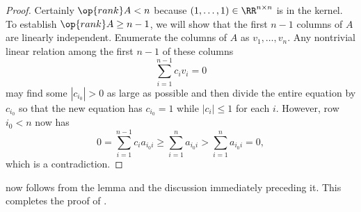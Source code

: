 \documentclass[../notes.tex]{subfiles}
\begin{document}
\begin{proof}
	Certainly $\op{rank}A<n$ because $(1,\ldots,1)\in\RR^{n\times n}$ is in the kernel. To establish $\op{rank}A\ge n-1$, we will show that the first $n-1$ columns of $A$ are linearly independent. Enumerate the columns of $A$ as $v_1,\ldots,v_n$. Any nontrivial linear relation among the first $n-1$ of these columns
	\[\sum_{i=1}^{n-1}c_iv_i=0\]
	may find some $\left|c_{i_0}\right|>0$ as large as possible and then divide the entire equation by $c_{i_0}$ so that the new equation has $c_{i_0}=1$ while $\left|c_i\right|\le1$ for each $i$. However, row $i_0<n$ now has
	\[0=\sum_{i=1}^{n-1}c_ia_{i_0i}\ge\sum_{i=1}^na_{i_0i}>\sum_{i=1}^na_{i_0i}=0,\]
	which is a contradiction.
\end{proof}
 now follows from the lemma and the discussion immediately preceding it. This completes the proof of .
\end{document}
